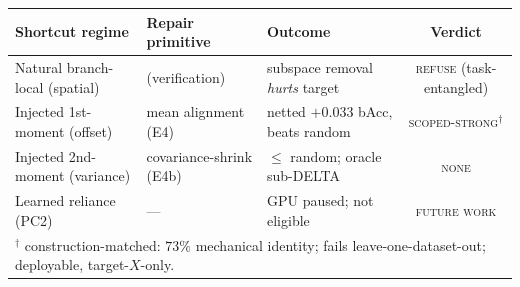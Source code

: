 \begin{tabular}{lllc}
\toprule
Shortcut regime & Repair primitive & Outcome & Verdict \\
\midrule
Natural branch-local (spatial) & (verification) & subspace removal \emph{hurts} target & \textsc{refuse} (task-entangled) \\
Injected 1st-moment (offset) & mean alignment (E4) & netted $+0.033$ bAcc, beats random & \textsc{scoped-strong}$^{\dagger}$ \\
Injected 2nd-moment (variance) & covariance-shrink (E4b) & $\le$ random; oracle sub-DELTA & \textsc{none} \\
Learned reliance (PC2) & --- & GPU paused; not eligible & \textsc{future work} \\
\bottomrule
\multicolumn{4}{l}{\footnotesize $^{\dagger}$ construction-matched: $73\%$ mechanical identity; fails leave-one-dataset-out; deployable, target-$X$-only.}
\end{tabular}
